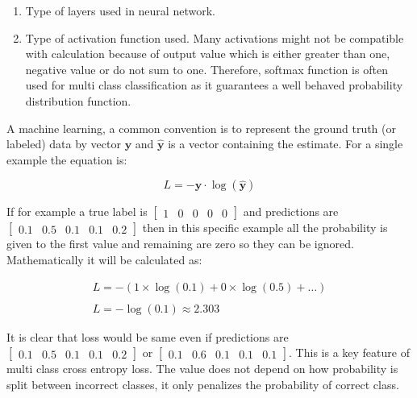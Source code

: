 \documentclass[11pt]{article}
\begin{document}
\begin{enumerate}
	\item Type of layers used in neural network.
	\item Type of activation function used. Many activations might not be compatible with calculation because of output value which is either greater than one, negative value or do not sum to one. Therefore, softmax function is often used for multi class classification as it guarantees a well behaved probability distribution function.
\end{enumerate}

A machine learning, a common convention is to represent the ground truth (or labeled) data by vector $\mathbf{y}$ and $\mathbf{\hat{y}}$ is a vector containing the estimate. For a single example the equation is:

\begin{equation}
L = - \mathbf{y} \cdot \log(\mathbf{\hat{y}})
\end{equation}

If for example a true label is $\left[\begin{array}{llllll}{1} & {0} & {0} & {0} & {0}\end{array}\right]$ and predictions are $\left[\begin{array}{llllll}{0.1} & {0.5} & {0.1} & {0.1} & {0.2}\end{array}\right]$ then in this specific example all the probability is given to the first value and remaining are zero so they can be ignored. Mathematically it will be calculated as:

$$
\begin{array}{l}{L=-(1 \times \log (0.1)+0 \times \log (0.5)+\ldots)} \\\\ {L=-\log (0.1) \approx 2.303}\end{array}
$$

It is clear that loss would be same even if predictions are $\left[\begin{array}{llllll}{0.1} & {0.5} & {0.1} & {0.1} & {0.2}\end{array}\right]$ or $\left[\begin{array}{llllll}{0.1} & {0.6} & {0.1} & {0.1} & {0.1}\end{array}\right]$. This is a key feature of multi class cross entropy loss. The value does not depend on how probability is split between incorrect classes, it only penalizes the probability of correct class.  
\end{document}
